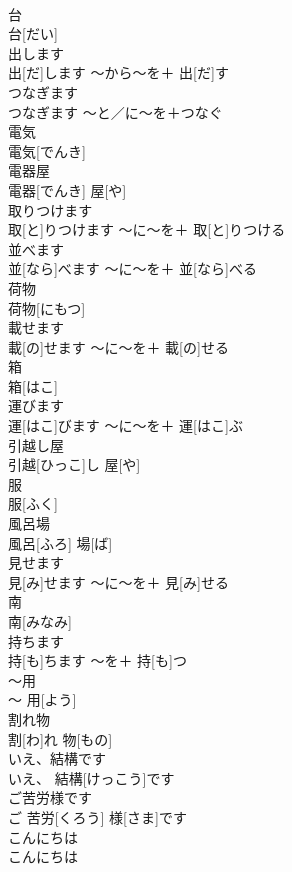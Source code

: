 \documentclass[8pt]{extreport}
\begin{document}
\begin{CJK}{UTF8}{min}
\\	台	
\\	台[だい]		
\\	出します	
\\	出[だ]します	〜から〜を＋ 出[だ]す	
\\	つなぎます	
\\	つなぎます	〜と／に〜を＋つなぐ	
\\	電気	
\\	電気[でんき]		
\\	電器屋	
\\	電器[でんき] 屋[や]		
\\	取りつけます	
\\	取[と]りつけます	〜に〜を＋ 取[と]りつける	
\\	並べます	
\\	並[なら]べます	〜に〜を＋ 並[なら]べる	
\\	荷物	
\\	荷物[にもつ]		
\\	載せます	
\\	載[の]せます	〜に〜を＋ 載[の]せる	
\\	箱	
\\	箱[はこ]		
\\	運びます	
\\	運[はこ]びます	〜に〜を＋ 運[はこ]ぶ	
\\	引越し屋	
\\	引越[ひっこ]し 屋[や]		
\\	服	
\\	服[ふく]		
\\	風呂場	
\\	風呂[ふろ] 場[ば]		
\\	見せます	
\\	見[み]せます	〜に〜を＋ 見[み]せる	
\\	南	
\\	南[みなみ]		
\\	持ちます	
\\	持[も]ちます	〜を＋ 持[も]つ	
\\	〜用	
\\	〜 用[よう]		
\\	割れ物	
\\	割[わ]れ 物[もの]		
\\	いえ、結構です	
\\	いえ、 結構[けっこう]です		
\\	ご苦労様です	
\\	ご 苦労[くろう] 様[さま]です		
\\	こんにちは	
\\	こんにちは		

\end{CJK}
\end{document}
